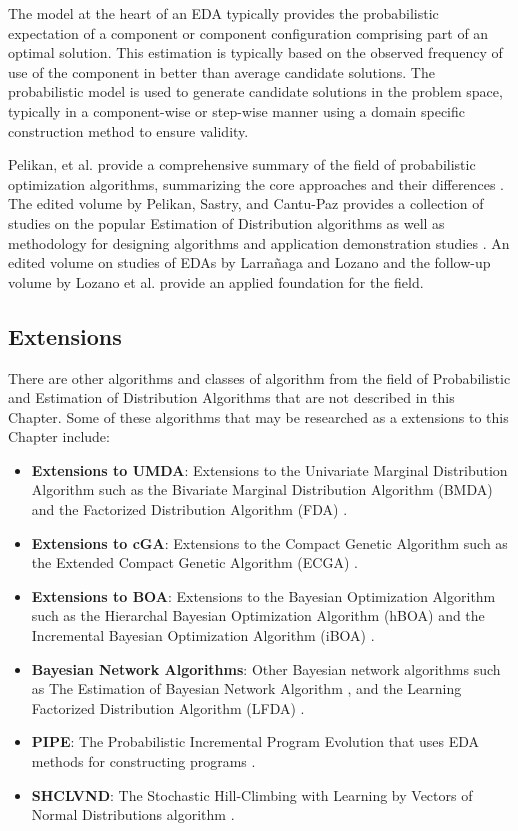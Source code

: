 \begin{bibunit}
The model at the heart of an EDA typically provides the probabilistic expectation of a component or component configuration comprising part of an optimal solution. This estimation is typically based on the observed frequency of use of the component in better than average candidate solutions. The probabilistic model is used to generate candidate solutions in the problem space, typically in a component-wise or step-wise manner using a domain specific construction method to ensure validity.

Pelikan, et al. provide a comprehensive summary of the field of probabilistic optimization algorithms, summarizing the core approaches and their differences \cite{Pelikan2002b}.
The edited volume by Pelikan, Sastry, and Cantu-Paz provides a collection of studies on the popular Estimation of Distribution algorithms as well as methodology for designing algorithms and application demonstration studies \cite{Pelikan2006}.
An edited volume on studies of EDAs by Larrañaga and Lozano \cite{Larranaga2002} and the follow-up volume by Lozano et al. \cite{Lozano2006} provide an applied foundation for the field.

% 
% 
\subsection{Extensions}
\label{sec:extensions}
There are other algorithms and classes of algorithm from the field of Probabilistic and Estimation of Distribution Algorithms that are not described in this Chapter. Some of these algorithms that may be researched as a extensions to this Chapter include:

\begin{itemize}
	\item \textbf{Extensions to UMDA}: Extensions to the Univariate Marginal Distribution Algorithm such as the Bivariate Marginal Distribution Algorithm (BMDA) \cite{Pelikan1998, Pelikan1999} and the Factorized Distribution Algorithm (FDA) \cite{Muhlenbein1999}.
	\item \textbf{Extensions to cGA}: Extensions to the Compact Genetic Algorithm such as the Extended Compact Genetic Algorithm (ECGA) \cite{Harik1999a, Harik2006}.
	\item \textbf{Extensions to BOA}: Extensions to the Bayesian Optimization Algorithm such as the Hierarchal Bayesian Optimization Algorithm (hBOA) \cite{Pelikan2000, Pelikan2001b} and the Incremental Bayesian Optimization Algorithm (iBOA) \cite{Pelikan2008}.
	\item \textbf{Bayesian Network Algorithms}: Other Bayesian network algorithms such as The Estimation of Bayesian Network Algorithm \cite{Etxeberria1999}, and the Learning Factorized Distribution Algorithm (LFDA) \cite{Muehlenbein1999}.
	\item \textbf{PIPE}: The Probabilistic Incremental Program Evolution that uses EDA methods for constructing programs \cite{Salustowicz1997}. 
	\item \textbf{SHCLVND}: The Stochastic Hill-Climbing with Learning by Vectors of Normal Distributions algorithm \cite{Rudlof1996}.
\end{itemize}


\end{bibunit}
